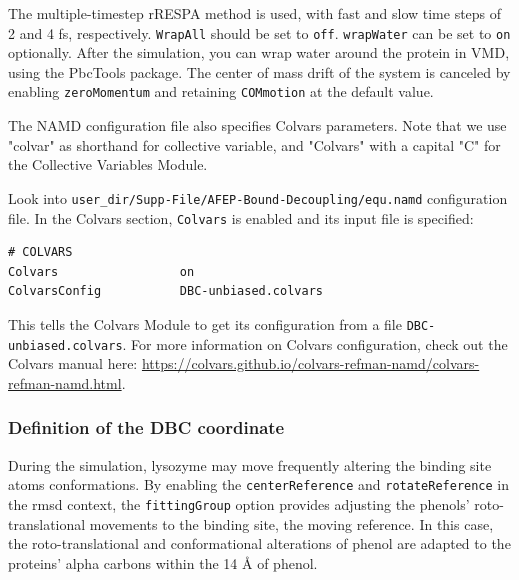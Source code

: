 \documentclass[9pt,tutorial]{livecoms}
\begin{document}
The multiple-timestep rRESPA method is used, with fast and slow time steps of 2 and 4 fs, respectively.
\texttt{WrapAll} should be set to \texttt{off}. \texttt{wrapWater} can be set to \texttt{on} optionally.
After the simulation, you can wrap water around the protein in VMD, using the 
PbcTools package.
The center of mass drift of the system is canceled by enabling \texttt{zeroMomentum} and retaining \texttt{COMmotion} at the default value.

The NAMD configuration file also specifies Colvars parameters.
Note that we use "colvar" as shorthand for collective variable, and "Colvars" with a capital "C" for the Collective Variables Module.

Look into \texttt{user\_dir/Supp-File/AFEP-Bound-Decoupling/equ.namd} configuration file.
In the Colvars section, \texttt{Colvars} is enabled and its input file is specified:
\begin{verbatim}
# COLVARS
Colvars                 on
ColvarsConfig           DBC-unbiased.colvars
\end{verbatim}

This tells the Colvars Module to get its configuration from a file  \texttt{DBC-unbiased.colvars}.
For more information on Colvars configuration, check out the Colvars manual here: \url{ https://colvars.github.io/colvars-refman-namd/colvars-refman-namd.html}\label{clovar}.

\subsubsection{Definition of the DBC coordinate}\label{Section 6.2.2}


During the simulation, lysozyme may move frequently altering the binding site atoms conformations. By enabling the \texttt{centerReference} and \texttt{rotateReference} in the rmsd context, the \texttt{fittingGroup} option provides adjusting the phenols’ roto-translational movements to the binding site, the moving reference. In this case, the roto-translational and conformational alterations of phenol are adapted to the proteins' alpha carbons within the 14 {\AA} of phenol.
\end{document}
